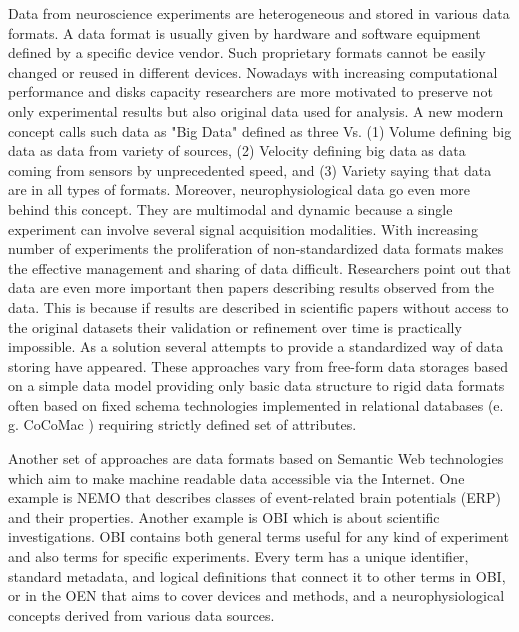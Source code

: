 \documentclass[utf8]{frontiersSCNS} %
\begin{document}
Data from neuroscience experiments are heterogeneous and stored in various data formats. A data format is usually given by hardware and software equipment defined by a specific device vendor. Such proprietary formats cannot be easily changed or reused in different devices. Nowadays with increasing computational performance and disks capacity researchers are more motivated to preserve not only experimental results but also original data used for analysis. A new modern concept calls such data as "Big Data" defined as three Vs\citep{mcafee2012big}. (1) Volume defining big data as data from variety of sources, (2) Velocity defining big data as data coming from sensors by unprecedented speed, and (3) Variety saying that data are in all types of formats. Moreover, neurophysiological data go even more behind this concept. They are multimodal and dynamic because a single experiment can involve several signal acquisition modalities. With increasing number of experiments the proliferation of non-standardized data formats makes the effective management and sharing of data difficult. Researchers point out that data are even more important then papers describing results observed from the data. This is because if results are described in scientific papers without access to the original datasets their validation or refinement over time is practically impossible. As a solution several attempts to provide a standardized way of data storing have appeared. These approaches vary from free-form data storages based on a simple data model providing only basic data structure\citep{10.3389/fninf.2011.00016} to rigid data formats often based on fixed schema technologies implemented in relational databases (e. g. CoCoMac \citep{10.3389/fninf.2012.00030,Kotter2004}) requiring strictly defined set of attributes. 
 
 
Another  set of approaches are data formats based on Semantic Web technologies which aim to make machine readable data accessible  via the Internet.  One example is NEMO \citep{DouFRFMT07} that describes classes of event-related brain potentials (ERP) and their properties.  Another example is OBI \citep{citeulike:7291351}  which is about scientific investigations.  OBI contains both general terms useful for any kind of experiment and also terms for specific experiments. Every term has a unique identifier, standard metadata, and logical definitions that connect it to other terms in OBI, or in the OEN \citep{10.3389/conf.fninf.2014.18.00044}  that aims to cover devices and methods, and a neurophysiological concepts derived from various data sources. 
\end{document}
